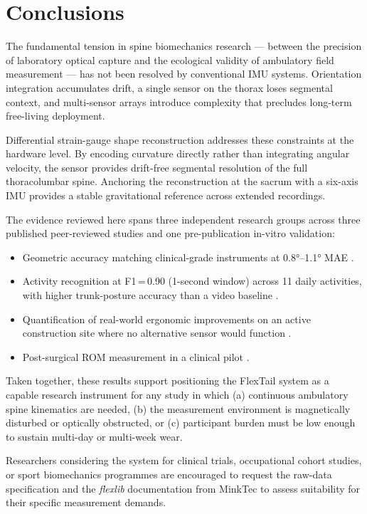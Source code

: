 \section{Conclusions}

The fundamental tension in spine biomechanics research --- between the precision of
laboratory optical capture and the ecological validity of ambulatory field measurement
--- has not been resolved by conventional \acs{IMU} systems.
Orientation integration accumulates drift, a single sensor on the thorax loses
segmental context, and multi-sensor arrays introduce complexity that precludes
long-term free-living deployment.

Differential strain-gauge shape reconstruction addresses these constraints at the
hardware level.
By encoding curvature directly rather than integrating angular velocity, the sensor
provides drift-free segmental resolution of the full thoracolumbar spine.
Anchoring the reconstruction at the sacrum with a six-axis \acs{IMU} provides a stable
gravitational reference across extended recordings.

The evidence reviewed here spans three independent research groups across three
published peer-reviewed studies and one pre-publication in-vitro validation:

\begin{itemize}
	\item Geometric accuracy matching clinical-grade instruments at \ang{0.8}--\ang{1.1}
	      \acs{MAE} \cite{walkling2025}.
	\item Activity recognition at F1\,=\,0.90 (1-second window) across 11 daily
	      activities, with higher trunk-posture accuracy than a video baseline
	      \cite{walkling2025}.
	\item Quantification of real-world ergonomic improvements on an active construction
	      site where no alternative sensor would function \cite{sawicki2026}.
	\item Post-surgical \acs{ROM} measurement in a clinical pilot \cite{marx2023}.
\end{itemize}

Taken together, these results support positioning the FlexTail system as a capable
research instrument for any study in which (a) continuous ambulatory spine kinematics
are needed, (b) the measurement environment is magnetically disturbed or optically
obstructed, or (c) participant burden must be low enough to sustain multi-day or
multi-week wear.

Researchers considering the system for clinical trials, occupational cohort studies,
or sport biomechanics programmes are encouraged to request the raw-data specification
and the \emph{flexlib} documentation from MinkTec to assess suitability for their
specific measurement demands.
